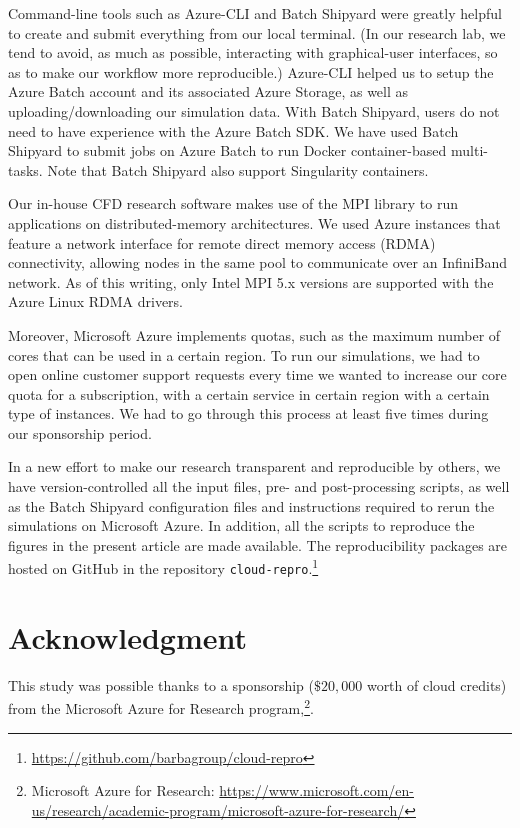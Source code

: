 \documentclass[10pt,journal,compsoc]{IEEEtran}
\begin{document}
Command-line tools such as Azure-CLI and Batch Shipyard were greatly helpful to create and submit everything from our local terminal. (In our research lab, we tend to avoid, as much as possible, interacting with graphical-user interfaces, so as to make our workflow more reproducible.)
Azure-CLI helped us to setup the Azure Batch account and its associated Azure Storage, as well as uploading/downloading our simulation data.
With Batch Shipyard, users do not need to have experience with the Azure Batch SDK.
We have used Batch Shipyard to submit jobs on Azure Batch to run Docker container-based multi-tasks.
Note that Batch Shipyard also support Singularity containers.

Our in-house CFD research software makes use of the MPI library to run applications on distributed-memory architectures.
We used Azure instances that feature a network interface for remote direct memory access (RDMA) connectivity, allowing nodes in the same pool to communicate over an InfiniBand network.
As of this writing, only Intel MPI 5.x versions are supported with the Azure Linux RDMA drivers.

Moreover, Microsoft Azure implements quotas, such as the maximum number of cores that can be used in a certain region.
To run our simulations, we had to open online customer support requests every time we wanted to increase our core quota for a subscription, with a certain service in certain region with a certain type of instances.
We had to go through this process at least five times during our sponsorship period.

In a new effort to make our research transparent and reproducible by others, we have version-controlled all the input files, pre- and post-processing scripts, as well as the Batch Shipyard configuration files and instructions required to rerun the simulations on Microsoft Azure.
In addition, all the scripts to reproduce the figures in the present article are made available.
The reproducibility packages are hosted on GitHub in the repository \texttt{cloud-repro}.\footnote{\url{https://github.com/barbagroup/cloud-repro}}

 \section*{Acknowledgment}
 
This study was possible thanks to a sponsorship ($\$20,000$ worth of cloud credits) from the Microsoft Azure for Research program,\footnote{Microsoft Azure for Research: \url{https://www.microsoft.com/en-us/research/academic-program/microsoft-azure-for-research/}}.



%
\end{document}
